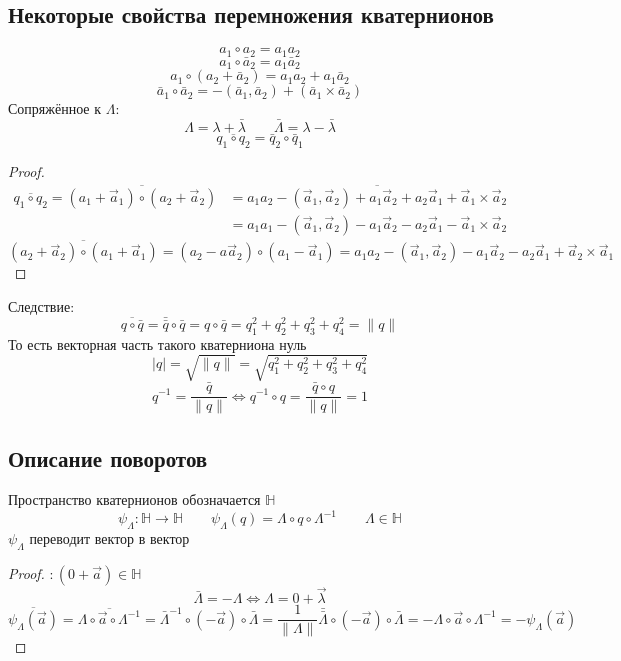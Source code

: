 \documentclass[crop=false]{standalone}
\begin{document}
\subsection{Некоторые свойства перемножения кватернионов}
\[a_1 \circ a_2 = a_1 a_2\]
\[a_1 \circ \bar a_2 = a_1 \bar a_2\]
\[a_1 \circ (a_2 + \bar a_2) = a_1 a_2 + a_1 \bar a_2 \]
\[\bar a_1 \circ \bar a_2 = - (\bar a_1, \bar a_2) + (\bar a_1 \times \bar a_2)\]
\Def Сопряжённое к $\Lambda$:
\[\Lambda = \lambda + \bar \lambda \qquad \bar \Lambda = \lambda - \bar \lambda\]
\keypoint
\[\overline{q_1 \circ  q_2} = \bar q_2 \circ \bar q_1\]
\begin{proof}
\[\begin{aligned}
\overline{q_1 \circ  q_2} = \overline{(a_1 + \vec a_1) \circ (a_2 + \vec a_2)} &= \overline{a_1 a_2 - (\vec a_1, \vec a_2) + a_1 \vec a_2 + a_2 \vec a_1 + \vec a_1 \times \vec a_2} \\
& = a_1 a_1 - (\vec a_1, \vec a_2) - a_1 \vec a_2 - a_2 \vec a_1 - \vec a_1 \times \vec a_2
\end{aligned}
\]
\[\overline{(a_2 + \vec a_2)\circ (a_1 + \vec a_1)} = (a_2 - a\vec a_2) \circ (a_1 - \vec a_1) = a_1 a_2 - (\vec a_1,\vec a_2 ) - a_1 \vec a_2 - a_2 \vec a_1 + \vec a_2 \times \vec a_1\]
\end{proof}
Следствие: \[\overline{q \circ \bar q} = \bar{\bar q} \circ \bar q = q \circ \bar q = q_1^2 + q_2^2 + q_3^2 + q_4^2 = \|q\|\]
То есть векторная часть такого кватерниона нуль
\[|q| = \sqrt{\| q\| }= \sqrt{ q_1^2 + q_2^2 + q_3^2 + q_4^2 }\]
\[q^{-1} = \frac{\bar q}{\| q \|} \iff q^{-1} \circ q = \frac{\bar q \circ q}{\|q \|} = 1\]
\subsection{Описание поворотов}
\Def Пространство кватернионов обозначается $\mathbb H$
\[\psi_\Lambda : \mathbb H \to \mathbb H \qquad \psi_\Lambda(q) = \Lambda \circ q \circ \Lambda^{-1} \qquad \Lambda \in \mathbb H\]
\keypoint $\psi_\Lambda$ переводит вектор в вектор
\begin{proof}
$: (0 + \vec a) \in \mathbb H$
\[\bar \Lambda = - \Lambda \iff \Lambda = 0 + \vec \lambda\]
\[\overline{\psi_\Lambda(\vec a)} = \overline{\Lambda \circ \vec a \circ \Lambda^{-1}} = \bar \Lambda^{-1} \circ (- \vec a) \circ \bar \Lambda = \frac{1}{\| \Lambda \|} \bar {\bar \Lambda} \circ (- \vec a) \circ \bar \Lambda = - \Lambda \circ \vec a \circ \Lambda^{-1} = - \psi_\Lambda(\vec a)\]    
\end{proof}
\end{document}
